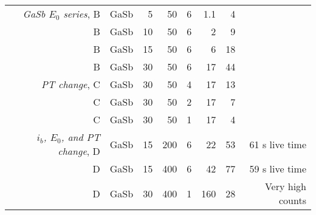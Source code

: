 \begin{table}[phtb]
\begin{center}
\begin{tabular}{rrrrrrrr}
            \emph{GaSb $E_0$ series}, B           & GaSb            & 5              & 50             & 6           & 1.1               & 4           &                     \\
            B                                     & GaSb            & 10             & 50             & 6           & 2                 & 9           &                     \\
            B                                     & GaSb            & 15             & 50             & 6           & 6                 & 18          &                     \\
            B                                     & GaSb            & 30             & 50             & 6           & 17                & 44          &                     \\
            \hline
            \emph{PT change}, C                   & GaSb            & 30             & 50             & 4           & 17                & 13          &                     \\
            C                                     & GaSb            & 30             & 50             & 2           & 17                & 7           &                     \\
            C                                     & GaSb            & 30             & 50             & 1           & 17                & 4           &                     \\
            \hline
            \emph{$i_b$, $E_0$, and PT change}, D & GaSb            & 15             & 200            & 6           & 22                & 53          & 61 s live time      \\
            D                                     & GaSb            & 15             & 400            & 6           & 42                & 77          & 59 s live time      \\
            D                                     & GaSb            & 30             & 400            & 1           & 160               & 28          & Very high counts    \\
            \hline
        \end{tabular}
    \end{center}
\end{table}
